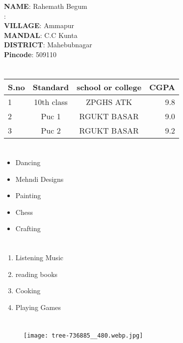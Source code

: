 \documentclass[a4paper,10pt]{article}
\title{\textbf{\color{brown}{RESUME}}}
\begin{document}
\maketitle
\section{{\color{violet}{INTRODUCTION TO MYSELF}}}
\textbf{NAME}: Rahemath Begum\\
\textbf{{\color{black}{ADDRESS}}}:\\
\textbf{VILLAGE}: Ammapur\\
\textbf{MANDAL}: C.C Kunta\\
\textbf{DISTRICT}: Mahebubnagar\\
\textbf{Pincode}: 509110\\
\section{{\color{violet}{EDUCATION DETAILS}}}
\begin{tabular}{|l|c|c|r|}
\hline
\centering
\textbf{S.no}&\textbf{Standard}&\textbf{school or college}&\textbf{CGPA}\\
\hline
1 & 10th class & ZPGHS ATK & 9.8\\
\hline
2 & Puc 1 & RGUKT BASAR & 9.0\\
\hline
3 & Puc 2 & RGUKT BASAR & 9.2\\
\hline
\end{tabular}
\section{{\color{violet}{EXTRA CURRICULAR ACTIVITIES}}}
\begin{itemize}
\item Dancing
\item Mehndi Designs
\item Painting
\item Chess
\item Crafting
\end{itemize}
\section{{\color{violet}{HOBBIES}}}
\begin{enumerate}
\item Listening Music
\item reading books
\item Cooking
\item Playing Games
\end{enumerate}
\section{{\color{violet}{IMAGE}}}
\begin{figure}[h]
\texttt{[image: tree-736885\_\_480.webp.jpg]}
\end{figure}
\end{document}
